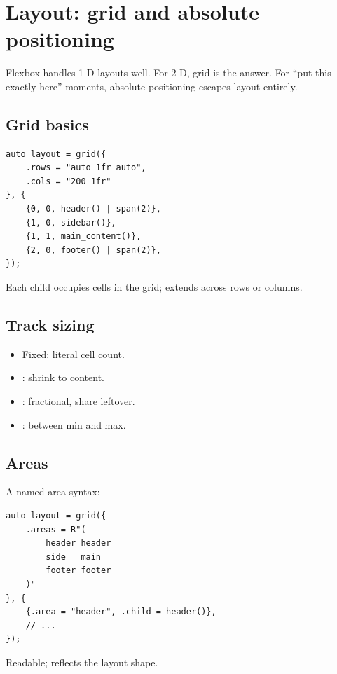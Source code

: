 \chapter{Layout: grid and absolute positioning}
\label{ch:grid}

\begin{aside}
Flexbox handles 1-D layouts well. For 2-D, grid is the
answer. For ``put this exactly here'' moments, absolute
positioning escapes layout entirely.
\end{aside}

\section{Grid basics}

\begin{lstlisting}
auto layout = grid({
    .rows = "auto 1fr auto",
    .cols = "200 1fr"
}, {
    {0, 0, header() | span(2)},
    {1, 0, sidebar()},
    {1, 1, main_content()},
    {2, 0, footer() | span(2)},
});
\end{lstlisting}

Each child occupies cells in the grid;  extends
across rows or columns.

\section{Track sizing}

\begin{itemize}[leftmargin=*]
  \item Fixed: literal cell count.
  \item {}: shrink to content.
  \item {}: fractional, share leftover.
  \item {}: between min and max.
\end{itemize}

\section{Areas}

A named-area syntax:

\begin{lstlisting}
auto layout = grid({
    .areas = R"(
        header header
        side   main
        footer footer
    )"
}, {
    {.area = "header", .child = header()},
    // ...
});
\end{lstlisting}

Readable; reflects the layout shape.

